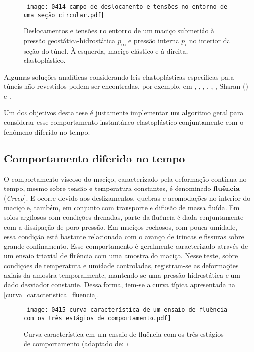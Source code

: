 \begin{figure}[H]
	\begin{center}
		\texttt{[image: 0414-campo de deslocamento e tensões no entorno de uma seção circular.pdf]}
	\end{center}
	\caption{\label{deslocamentos_tensoes_analitico}Deslocamentos e tensões no entorno de um maciço submetido à pressão geostática-hidrostática $p_{\infty}$ e pressão interna $p_i$ no interior da seção do túnel. À esquerda, maciço elástico e à direita, elastoplástico.}
\end{figure}

Algumas soluções analíticas considerando leis elastoplásticas específicas para túneis não revestidos podem ser encontradas, por exemplo, em , , , , , , Sharan (\citeyear{Sharan2003,Sharan2005}) e .

Um dos objetivos desta tese é justamente implementar um algoritmo geral para considerar esse comportamento instantâneo elastoplástico conjuntamente com o fenômeno diferido no tempo.

\subsection{Comportamento diferido no tempo}

O comportamento viscoso do maciço, caracterizado pela deformação contínua no tempo, mesmo sobre tensão e temperatura constantes, é denominado \textbf{fluência} (\textit{Creep}). E ocorre devido aos deslizamentos, quebras e acomodações no interior do maciço e, também, em conjunto com transporte e difusão de massa fluída. Em solos argilosos com condições drenadas, parte da fluência é dada conjuntamente com a dissipação de poro-pressão. Em maciços rochosos, com pouca umidade, essa condição está bastante relacionada com o avanço de trincas e fissuras sobre grande confinamento. Esse comportamento é geralmente caracterizado através de um ensaio triaxial de fluência com uma amostra do maciço. Nesse teste, sobre condições de temperatura e umidade controladas, registram-se as deformações axiais da amostra temporalmente, mantendo-se uma pressão hidrostática e um dado desviador constante. Dessa forma, tem-se a curva típica apresentada na \autoref{curva_caracteristica_fluencia}.

\begin{figure}[H]
	\begin{center}
		\texttt{[image: 0415-curva característica de um ensaio de fluência com os três estágios de comportamento.pdf]}
	\end{center}
	\caption{\label{curva_caracteristica_fluencia}Curva característica em um ensaio de fluência com os três estágios de comportamento (adaptado de: )}
\end{figure}

